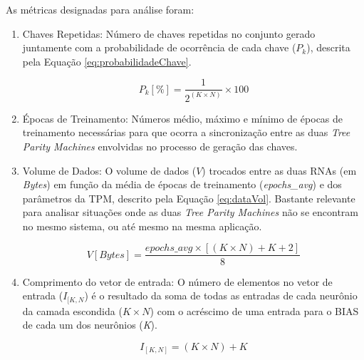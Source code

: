 \documentclass[a4paper,10pt,oneside,conference,final,keeplastbox]{inatel}
\newcommand{\Bytes}{\textit{Bytes}\xspace}
\begin{document}
            As métricas designadas para análise foram:
            \begin{enumerate}
                \item Chaves Repetidas:
                    Número de chaves repetidas no conjunto gerado juntamente com a probabilidade de ocorrência de cada chave ($P_k$), descrita pela Equação \eqref{eq:probabilidadeChave}.
                    
                    \begin{equation}
                        \label{eq:probabilidadeChave}
                        P_k [\%] = \frac{1}{2^{(K \times N)}} \times 100
                    \end{equation}
                
                \item Épocas de Treinamento:
                    Números médio, máximo e mínimo de épocas de treinamento necessárias para que ocorra a sincronização entre as duas \textit{Tree Parity Machines} envolvidas no processo de geração das chaves.
                
                \item Volume de Dados:
                    O volume de dados ($V$) trocados entre as duas RNAs (em \Bytes) em função da média de épocas de treinamento (\textit{epochs\_avg}) e dos parâmetros da TPM, descrito pela Equação \eqref{eq:dataVol}. Bastante relevante para analisar situações onde as duas \textit{Tree Parity Machines} não se encontram no mesmo sistema, ou até mesmo na mesma aplicação.
                    
                    \begin{equation}
                        \label{eq:dataVol}
                        V [\Bytes] = \frac{epochs\_avg \times [(K \times N) + K + 2]}{8}
                    \end{equation}
                    
                \item Comprimento do vetor de entrada:
                    O número de elementos no vetor de entrada ($I_{[K,N}$) é o resultado da soma de todas as entradas de cada neurônio da camada escondida ($K \times N$) com o acréscimo de uma entrada para o BIAS de cada um dos neurônios (\textit{K}).
                    
                    \begin{equation}
                        \label{eq:inputArraySize}
                        I_{[K, N]} = (K \times N) + K
                    \end{equation}
           

\end{enumerate}
\end{document}

